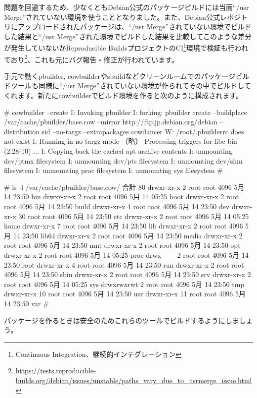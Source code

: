 \documentclass[mingoth,a4paper]{jsarticle}
\begin{document}
問題を回避するため、少なくともDebian公式のパッケージビルドには当面``/usr Merge''されていない環境を使うこととなりました。また、Debian公式レポジトリにアップロードされたパッケージは、``/usr Merge''されていない環境でビルドした結果と``/usr Merge''された環境でビルドした結果を比較してこのような差分が発生していないかReproducible BuildsプロジェクトのCI\footnote{Continuous Integration、継続的インテグレーション}環境で検証も行われており\footnote{\url{https://tests.reproducible-builds.org/debian/issues/unstable/paths_vary_due_to_usrmerge_issue.html}}、これも元にバグ報告・修正が行われています。

手元で動くpbuilder, cowbuilderやsbuildなどクリーンルームでのパッケージビルドツールも同様に``/usr Merge''されていない環境が作られてその中でビルドしてくれます。新たにcowbuilderでビルド環境を作ると次のように構成されます。

\begin{commandline}
# cowbuilder --create
I: Invoking pbuilder
I: forking: pbuilder create --buildplace /var/cache/pbuilder/base.cow --mirror http://ftp.jp.debian.org/debian --distribution sid --no-targz --extrapackages cowdancer
W: /root/.pbuilderrc does not exist
I: Running in no-targz mode
（略）
Processing triggers for libc-bin (2.28-10) ...
I: Copying back the cached apt archive contents
I: unmounting dev/ptmx filesystem
I: unmounting dev/pts filesystem
I: unmounting dev/shm filesystem
I: unmounting proc filesystem
I: unmounting sys filesystem
# 
\end{commandline}
\begin{commandline}
# ls -l /var/cache/pbuilder/base.cow/
合計 80
drwxr-xr-x  2 root root 4096  5月 14 23:50 bin
drwxr-xr-x  2 root root 4096  5月 14 05:25 boot
drwxr-xr-x  2 root root 4096  5月 14 23:50 build
drwxr-xr-x  4 root root 4096  5月 14 23:50 dev
drwxr-xr-x 30 root root 4096  5月 14 23:50 etc
drwxr-xr-x  2 root root 4096  5月 14 05:25 home
drwxr-xr-x  7 root root 4096  5月 14 23:50 lib
drwxr-xr-x  2 root root 4096  5月 14 23:50 lib64
drwxr-xr-x  2 root root 4096  5月 14 23:50 media
drwxr-xr-x  2 root root 4096  5月 14 23:50 mnt
drwxr-xr-x  2 root root 4096  5月 14 23:50 opt
drwxr-xr-x  2 root root 4096  5月 14 05:25 proc
drwx------  2 root root 4096  5月 14 23:50 root
drwxr-xr-x  4 root root 4096  5月 14 23:50 run
drwxr-xr-x  2 root root 4096  5月 14 23:50 sbin
drwxr-xr-x  2 root root 4096  5月 14 23:50 srv
drwxr-xr-x  2 root root 4096  5月 14 05:25 sys
drwxrwxrwt  2 root root 4096  5月 14 23:50 tmp
drwxr-xr-x 10 root root 4096  5月 14 23:50 usr
drwxr-xr-x 11 root root 4096  5月 14 23:50 var
#
\end{commandline}
パッケージを作るときは安全のためこれらのツールでビルドするようにしましょう。
\end{document}
